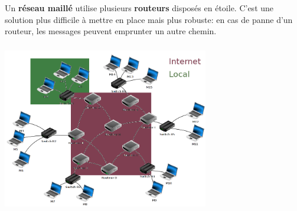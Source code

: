 \documentclass[svgnames,11pt]{beamer}
\begin{document}
\begin{frame}
    \frametitle{}

    \begin{aretenir}[]
        Un \textbf{réseau maillé} utilise plusieurs \textbf{routeurs} disposés en étoile. C'est une solution plus difficile à mettre en place mais plus robuste: en cas de panne d'un routeur, les messages peuvent emprunter un autre chemin.
    \end{aretenir}

\end{frame}
\begin{frame}
    \frametitle{}

    \begin{center}
        \centering
        \includegraphics[width=9cm]{ressources/reseaux.png}
        \label{IMG}
    \end{center}

\end{frame}
\end{document}
